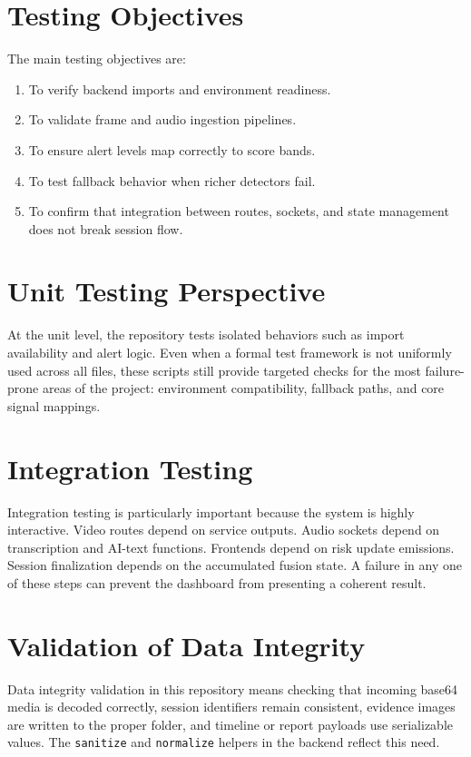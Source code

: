 \documentclass[12pt,a4paper]{extreport}
\begin{document}
\section{Testing Objectives}
The main testing objectives are:
\begin{enumerate}
  \item To verify backend imports and environment readiness.
  \item To validate frame and audio ingestion pipelines.
  \item To ensure alert levels map correctly to score bands.
  \item To test fallback behavior when richer detectors fail.
  \item To confirm that integration between routes, sockets, and state management does not break session flow.
\end{enumerate}

\section{Unit Testing Perspective}
At the unit level, the repository tests isolated behaviors such as import availability and alert logic. Even when a formal test framework is not uniformly used across all files, these scripts still provide targeted checks for the most failure-prone areas of the project: environment compatibility, fallback paths, and core signal mappings.

\section{Integration Testing}
Integration testing is particularly important because the system is highly interactive. Video routes depend on service outputs. Audio sockets depend on transcription and AI-text functions. Frontends depend on risk update emissions. Session finalization depends on the accumulated fusion state. A failure in any one of these steps can prevent the dashboard from presenting a coherent result.

\section{Validation of Data Integrity}
Data integrity validation in this repository means checking that incoming base64 media is decoded correctly, session identifiers remain consistent, evidence images are written to the proper folder, and timeline or report payloads use serializable values. The \texttt{sanitize} and \texttt{normalize} helpers in the backend reflect this need.
\end{document}

